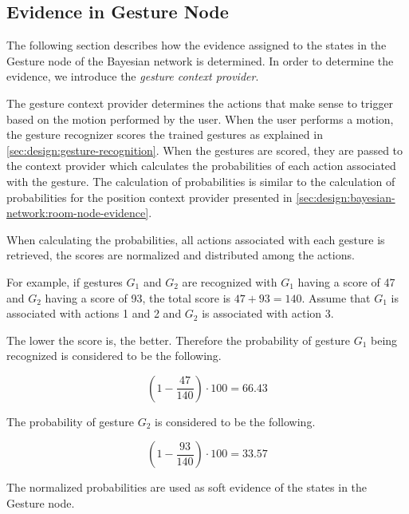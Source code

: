 \subsection{Evidence in Gesture Node}
\label{sec:design:bayesian-network:gesture-node-evidence}

The following section describes how the evidence assigned to the states in the Gesture node of the Bayesian network is determined. In order to determine the evidence, we introduce the \emph{gesture context provider}.

The gesture context provider determines the actions that make sense to trigger based on the motion performed by the user. When the user performs a motion, the gesture recognizer scores the trained gestures as explained in \cref{sec:design:gesture-recognition}. When the gestures are scored, they are passed to the context provider which calculates the probabilities of each action associated with the gesture. The calculation of probabilities is similar to the calculation of probabilities for the position context provider presented in \cref{sec:design:bayesian-network:room-node-evidence}.

When calculating the probabilities, all actions associated with each gesture is retrieved, the scores are normalized and distributed among the actions.

For example, if gestures $G_1$ and $G_2$ are recognized with $G_1$ having a score of 47 and $G_2$ having a score of 93, the total score is $47 + 93 = 140$. Assume that $G_1$ is associated with actions 1 and 2 and $G_2$ is associated with action 3.

The lower the score is, the better. Therefore the probability of gesture $G_1$ being recognized is considered to be the following.

\begin{equation*}
(1 - \frac{47}{140}) \cdot 100 = 66.43
\end{equation*}

The probability of gesture $G_2$ is considered to be the following.

\begin{equation*}
(1 - \frac{93}{140}) \cdot 100 = 33.57
\end{equation*}

The normalized probabilities are used as soft evidence of the states in the Gesture node.

